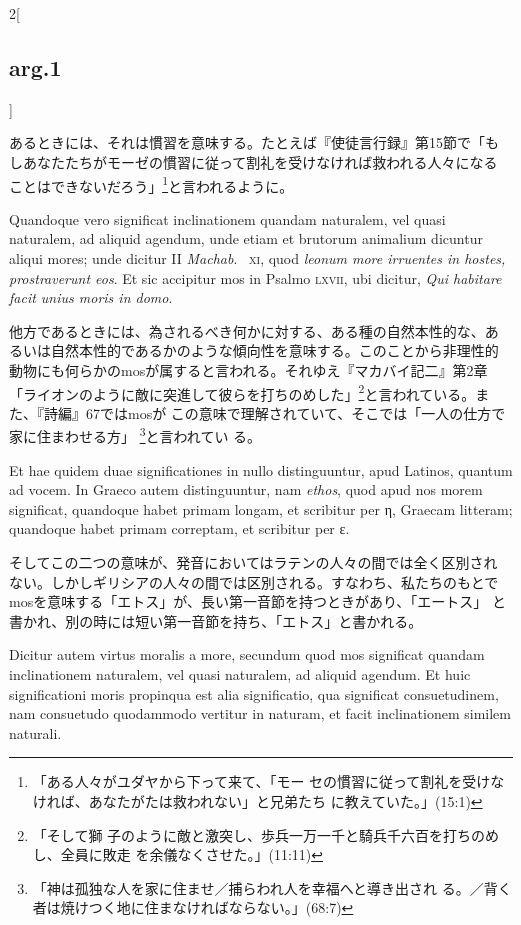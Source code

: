 \documentclass[paper=a4paper,fontsize=10pt,jafontsize=9pt,titlepage]{jlreq}
\begin{document}
\begin{paracol}{2}[\subsection{arg.1}]
\switchcolumn

あるときには、それは慣習を意味する。たとえば『使徒言行録』第15節で「も
しあなたたちがモーゼの慣習に従って割礼を受けなければ救われる人々になる
ことはできないだろう」\footnote{「ある人々がユダヤから下って来て、「モー
セの慣習に従って割礼を受けなければ、あなたがたは救われない」と兄弟たち
に教えていた。」(15:1)}と言われるように。

\switchcolumn*

Quandoque vero significat inclinationem quandam naturalem, vel quasi
naturalem, ad aliquid agendum, unde etiam et brutorum animalium
dicuntur aliqui mores; unde dicitur II {\itshape Machab}.~{\scshape
xi}, quod {\itshape leonum more irruentes in hostes, prostraverunt
eos}. Et sic accipitur mos in Psalmo {\scshape lxvii}, ubi dicitur,
{\itshape Qui habitare facit unius moris in domo}.

\switchcolumn

他方であるときには、為されるべき何かに対する、ある種の自然本性的な、あ
るいは自然本性的であるかのような傾向性を意味する。このことから非理性的
動物にも何らかのmosが属すると言われる。それゆえ『マカバイ記二』第2章
「ライオンのように敵に突進して彼らを打ちのめした」\footnote{「そして獅
子のように敵と激突し、歩兵一万一千と騎兵千六百を打ちのめし、全員に敗走
を余儀なくさせた。」(11:11)}と言われている。また、『詩編』67ではmosが
この意味で理解されていて、そこでは「一人の仕方で家に住まわせる方」
\footnote{「神は孤独な人を家に住ませ／捕らわれ人を幸福へと導き出され
る。／背く者は焼けつく地に住まなければならない。」(68:7)}と言われてい
る。

\switchcolumn*

Et hae quidem duae
significationes in nullo distinguuntur, apud Latinos, quantum ad
vocem. In Graeco autem distinguuntur, nam {\itshape ethos}, quod apud
nos morem significat, quandoque habet primam longam, et scribitur per
η, Graecam litteram; quandoque habet primam correptam, et
scribitur per ε.

\switchcolumn

そしてこの二つの意味が、発音においてはラテンの人々の間では全く区別され
ない。しかしギリシアの人々の間では区別される。すなわち、私たちのもとで
mosを意味する「エトス」が、長い第一音節を持つときがあり、「エートス」
と書かれ、別の時には短い第一音節を持ち、「エトス」と書かれる。

\switchcolumn*

Dicitur autem virtus moralis a more, secundum quod mos significat
quandam inclinationem naturalem, vel quasi naturalem, ad aliquid
agendum.  Et huic significationi moris propinqua est alia
significatio, qua significat consuetudinem, nam consuetudo quodammodo
vertitur in naturam, et facit inclinationem similem
naturali.


\end{paracol}
\end{document}
